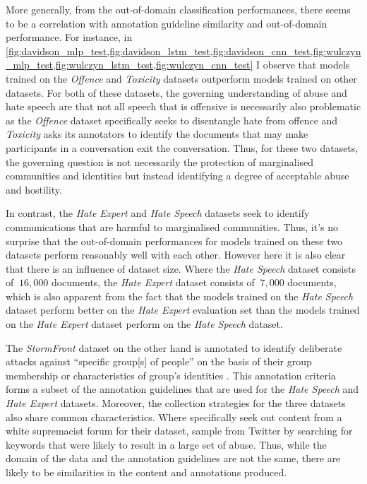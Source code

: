 More generally, from the out-of-domain classification performances, there seems to be a correlation with annotation guideline similarity and out-of-domain performance. For instance, in \cref{fig:davidson_mlp_test,fig:davidson_lstm_test,fig:davidson_cnn_test,fig:wulczyn_mlp_test,fig:wulczyn_lstm_test,fig:wulczyn_cnn_test} I observe that models trained on the \textit{Offence} and \textit{Toxicity} datasets outperform models trained on other datasets. For both of these datasets, the governing understanding of abuse and hate speech are that not all speech that is offensive is necessarily also problematic as the \textit{Offence} dataset specifically seeks to disentangle hate from offence and \textit{Toxicity} asks its annotators to identify the documents that may make participants in a conversation exit the conversation. Thus, for these two datasets, the governing question is not necessarily the protection of marginalised communities and identities but instead identifying a degree of acceptable abuse and hostility.

In contrast, the \textit{Hate Expert} and \textit{Hate Speech} datasets seek to identify communications that are harmful to marginalised communities. Thus, it's no surprise that the out-of-domain performances for models trained on these two datasets perform reasonably well with each other. However here it is also clear that there is an influence of dataset size. Where the \textit{Hate Speech} dataset consists of $~16,000$ documents, the \textit{Hate Expert} dataset consists of $~7,000$ documents, which is also apparent from the fact that the models trained on the \textit{Hate Speech} dataset perform better on the \textit{Hate Expert} evaluation set than the models trained on the \textit{Hate Expert} dataset perform on the \textit{Hate Speech} dataset.

The \textit{StormFront} dataset on the other hand is annotated to identify deliberate attacks against ``specific group[s] of people'' on the basis of their group membership or characteristics of group's identities \citep{Garcia:2019}. This annotation criteria forms a subset of the annotation guidelines that are used for the \textit{Hate Speech} and \textit{Hate Expert} datasets. Moreover, the collection strategies for the three datasets also share common characteristics. Where \citet{Garcia:2019} specifically seek out content from a white supremacist forum for their dataset, \citet{Waseem:2016,Waseem-Hovy:2016} sample from Twitter by searching for keywords that were likely to result in a large set of abuse. Thus, while the domain of the data and the annotation guidelines are not the same, there are likely to be similarities in the content and annotations produced.

